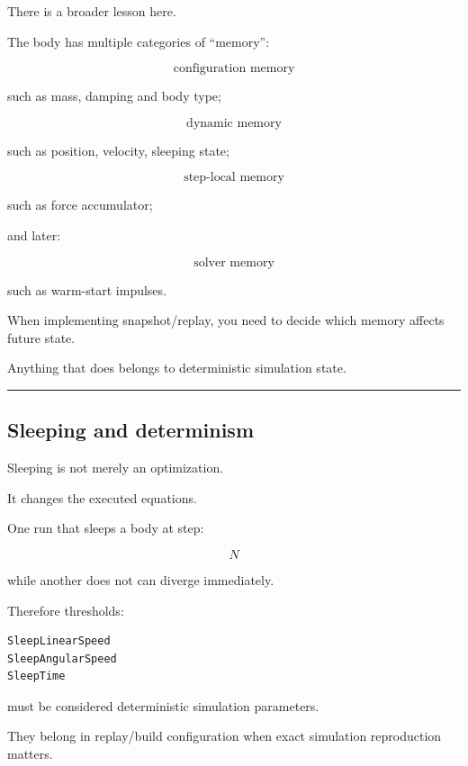 \hypertarget{06-engine-ii-ch037-rigid-body-state-memory-and-ownership}{}

There is a broader lesson here.

The body has multiple categories of ``memory'':

\[
\boxed{
\text{configuration memory}
}
\]

such as mass, damping and body type;

\[
\boxed{
\text{dynamic memory}
}
\]

such as position, velocity, sleeping state;

\[
\boxed{
\text{step-local memory}
}
\]

such as force accumulator;

and later:

\[
\boxed{
\text{solver memory}
}
\]

such as warm-start impulses.

When implementing snapshot/replay, you need to decide which memory affects future state.

Anything that does belongs to deterministic simulation state.

\begin{center}\rule{0.5\linewidth}{0.5pt}\end{center}

\subsection{Sleeping and determinism}\label{06-engine-ii-ch037-sleeping-and-determinism}

\hypertarget{06-engine-ii-ch037-sleeping-and-determinism}{}

Sleeping is not merely an optimization.

It changes the executed equations.

One run that sleeps a body at step:

\[
N
\]

while another does not can diverge immediately.

Therefore thresholds:

\begin{verbatim}
SleepLinearSpeed
SleepAngularSpeed
SleepTime
\end{verbatim}

must be considered deterministic simulation parameters.

They belong in replay/build configuration when exact simulation reproduction matters.

